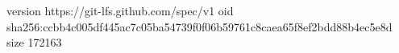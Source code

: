 version https://git-lfs.github.com/spec/v1
oid sha256:ccbb4c005df445ac7c05ba54739f0f06b59761c8caea65f8ef2bdd88b4ec5e8d
size 172163
